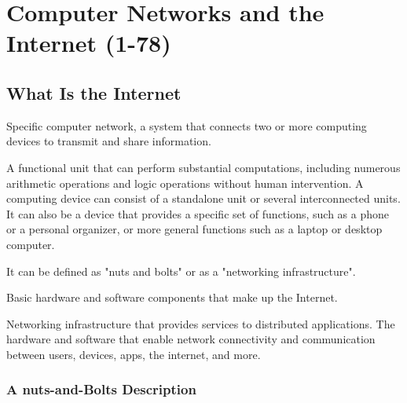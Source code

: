 \chapter{Computer Networks and the Internet (1-78)}


\section{What Is the Internet}

\begin{definition}\label{def:public_internet_1}
    Specific computer network, a system that connects two or more computing 
    devices to transmit and share information.
\end{definition}

\begin{definition}\label{def:computing_device_1}
    A functional unit that can perform substantial computations, including 
    numerous arithmetic operations and logic operations without human 
    intervention. A computing device can consist of a standalone unit or 
    several interconnected units. It can also be a device that provides a 
    specific set of functions, such as a phone or a personal organizer, or 
    more general functions such as a laptop or desktop computer. 
\end{definition}

\begin{definition*}
    It can be defined as "nuts and bolts" or as a "networking infrastructure".
    \begin{definition}\label{def:internet_def_1}
        Basic hardware and software components that make up the Internet.
    \end{definition}
    \begin{definition}\label{def:internet_def_2}
        Networking infrastructure that provides services to distributed 
        applications. The hardware and software that enable network 
        connectivity and communication between users, devices, apps, the 
        internet, and more.
    \end{definition}
\end{definition*}


\newpage

\subsection{A nuts-and-Bolts Description}

